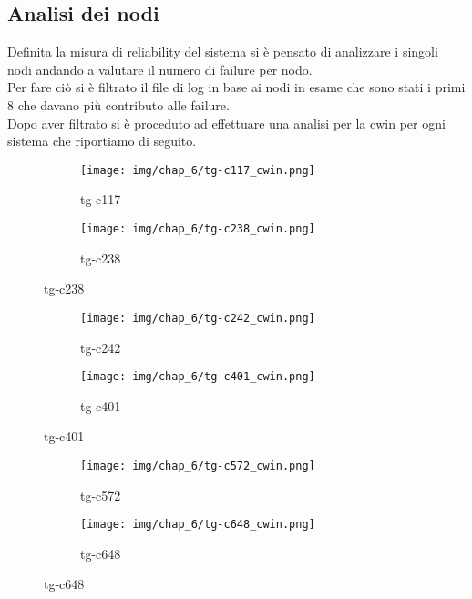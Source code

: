 \subsection{Analisi dei nodi}
Definita la misura di reliability del sistema si è pensato di analizzare i singoli nodi andando a valutare il numero di failure per nodo.\\
Per fare ciò si è filtrato il file di log in base ai nodi in esame che sono stati i primi 8 che davano più contributo alle failure.\\
Dopo aver filtrato si è proceduto ad effettuare una analisi per la cwin per ogni sistema che riportiamo di seguito.\\
\begin{figure}[H]
    \centering
    \begin{subfigure}{0.25\textwidth}
        \centering
        \texttt{[image: img/chap\_6/tg-c117\_cwin.png]}
        \caption{tg-c117}
        \label{fig:tgc117}
    \end{subfigure}
    \begin{subfigure}{0.25\textwidth}
        \centering
        \texttt{[image: img/chap\_6/tg-c238\_cwin.png]}
        \caption{tg-c238}
        \label{fig:tgc238}
    \end{subfigure}
\end{figure}
\begin{figure}[h]
    \centering
    \begin{subfigure}{0.25\textwidth}
        \centering
        \texttt{[image: img/chap\_6/tg-c242\_cwin.png]}
        \caption{tg-c242}
        \label{fig:tgc242}
    \end{subfigure}
    \begin{subfigure}{0.25\textwidth}
        \centering
        \texttt{[image: img/chap\_6/tg-c401\_cwin.png]}
        \caption{tg-c401}
        \label{fig:tgc401}
    \end{subfigure}
\end{figure}
\begin{figure}[H]
    \centering
    \begin{subfigure}{0.25\textwidth}
        \centering
        \texttt{[image: img/chap\_6/tg-c572\_cwin.png]}
        \caption{tg-c572}
        \label{fig:tgc572}
    \end{subfigure}
    \begin{subfigure}{0.25\textwidth}
        \centering
        \texttt{[image: img/chap\_6/tg-c648\_cwin.png]}
        \caption{tg-c648}
        \label{fig:tgc648}
    \end{subfigure}
\end{figure}

